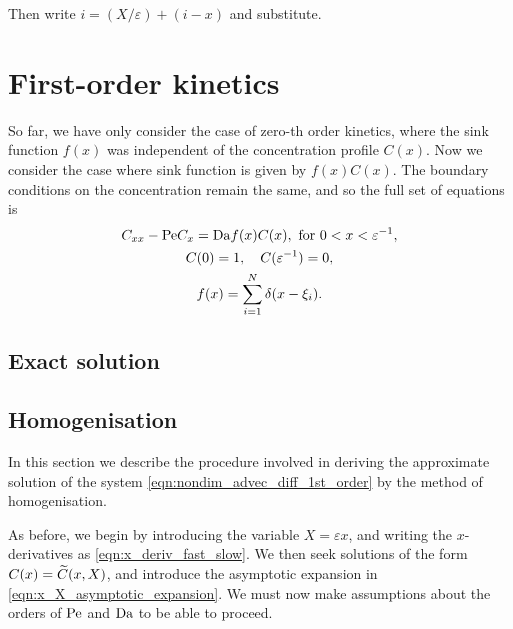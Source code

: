 Then write \(i = (X/\varepsilon) + (i - x)\) and substitute.


\section{First-order kinetics}

So far, we have only consider the case of zero-th order kinetics, where the
sink function \(f(x)\) was independent of the concentration profile \(C(x)\).
Now we consider the case where sink function is given by \(f(x) C(x)\). The
boundary conditions on the concentration remain the same, and so the full
set of equations is
\begin{subequations}
    \label{eqn:nondim_advec_diff_1st_order}
    \begin{gather}
        \label{eqn:nondim_advec_diff_1st_order_eq}
        C_{xx} - \mathrm{Pe} C_x = \mathrm{Da} f(x) C(x), \text{ for } 0 < x < \varepsilon^{-1},\\
        \label{eqn:nondim_advec_diff_1st_order_bcs}
        C(0) = 1, \quad C(\varepsilon^{-1}) = 0,\\
        \label{eqn:nondim_advec_diff_1st_order_sinks}
        f(x) = \sum_{i=1}^N \delta(x-\xi_i).
    \end{gather}
\end{subequations}

\subsection{Exact solution}

\subsection{Homogenisation}
In this section we describe the procedure involved in deriving the approximate
solution of the system \eqref{eqn:nondim_advec_diff_1st_order} by the method of
homogenisation.

As before, we begin by introducing the variable \(X = \varepsilon x\), and
writing the \(x\)-derivatives as \eqref{eqn:x_deriv_fast_slow}. We then seek
solutions of the form \(C(x) = \widetilde{C}(x,X)\), and introduce the asymptotic
expansion in \eqref{eqn:x_X_asymptotic_expansion}. We must now make assumptions
about the orders of \(\mathrm{Pe}\) and \(\mathrm{Da}\) to be able to proceed.

